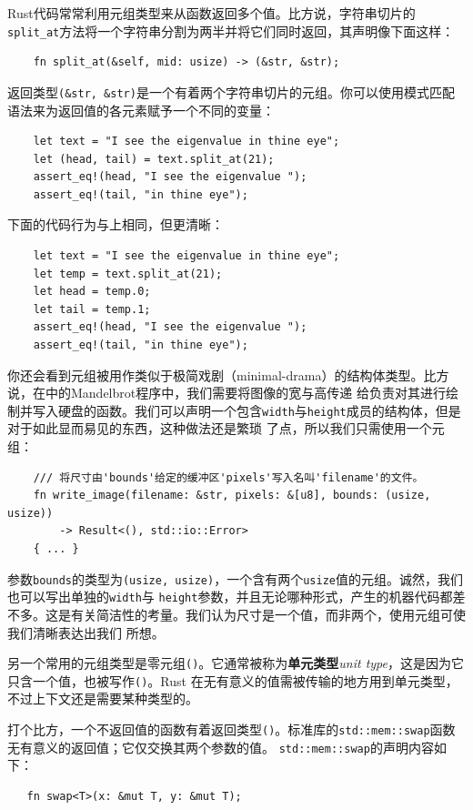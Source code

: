 \medskip
Rust代码常常利用元组类型来从函数返回多个值。比方说，字符串切片的\texttt{split\_at}方法将一个字符串分割为两半并将它们同时返回，其声明像下面这样：
\begin{verbatim}
    fn split_at(&self, mid: usize) -> (&str, &str);
\end{verbatim}

\smallskip
返回类型\texttt{(\&str, \&str)}是一个有着两个字符串切片的元组。你可以使用模式匹配语法来为返回值的各元素赋予一个不同的变量：
\begin{verbatim}
    let text = "I see the eigenvalue in thine eye";
    let (head, tail) = text.split_at(21);
    assert_eq!(head, "I see the eigenvalue ");
    assert_eq!(tail, "in thine eye");
\end{verbatim}

\smallskip
下面的代码行为与上相同，但更清晰：
\begin{verbatim}
    let text = "I see the eigenvalue in thine eye";
    let temp = text.split_at(21);
    let head = temp.0;
    let tail = temp.1;
    assert_eq!(head, "I see the eigenvalue ");
    assert_eq!(tail, "in thine eye");
\end{verbatim}

\smallskip
你还会看到元组被用作类似于极简戏剧（minimal-drama）的结构体类型。比方说，在中的Mandelbrot程序中，我们需要将图像的宽与高传递
给负责对其进行绘制并写入硬盘的函数。我们可以声明一个包含\texttt{width}与\texttt{height}成员的结构体，但是对于如此显而易见的东西，这种做法还是繁琐
了点，所以我们只需使用一个元组：
\begin{verbatim}
    /// 将尺寸由'bounds'给定的缓冲区'pixels'写入名叫'filename'的文件。
    fn write_image(filename: &str, pixels: &[u8], bounds: (usize, usize))
        -> Result<(), std::io::Error> 
    { ... }
\end{verbatim}

\smallskip
参数\texttt{bounds}的类型为\texttt{(usize, usize)}，一个含有两个\texttt{usize}值的元组。诚然，我们也可以写出单独的\texttt{width}与
\texttt{height}参数，并且无论哪种形式，产生的机器代码都差不多。这是有关简洁性的考量。我们认为尺寸是一个值，而非两个，使用元组可使我们清晰表达出我们
所想。

\medskip
另一个常用的元组类型是零元组\texttt{()}。它通常被称为\textbf{单元类型}\textit{unit type}，这是因为它只含一个值，也被写作\texttt{()}。Rust
在无有意义的值需被传输的地方用到单元类型，不过上下文还是需要某种类型的。

\medskip
打个比方，一个不返回值的函数有着返回类型\texttt{()}。标准库的\texttt{std::mem::swap}函数无有意义的返回值；它仅交换其两个参数的值。
\texttt{std::mem::swap}的声明内容如下：
\begin{verbatim}
   fn swap<T>(x: &mut T, y: &mut T);
\end{verbatim}

